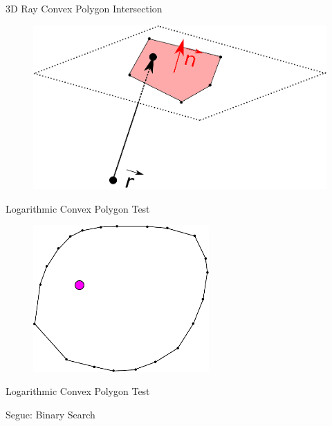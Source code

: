 \documentclass{beamer}
\begin{document}
\begin{frame}{3D Ray Convex Polygon Intersection}

\begin{figure}[t]
	\centering
	\includegraphics[width=\textwidth]{PolygonRayIntersect.pdf}
\end{figure}


\end{frame}



\begin{frame}{Logarithmic Convex Polygon Test}

\begin{figure}[t]
	\centering
	\includegraphics[width=0.6\textwidth]{ConvexPolygon.pdf}
\end{figure}

\end{frame}


\begin{frame}{Logarithmic Convex Polygon Test}

Segue: Binary Search

\end{frame}
\end{document}
